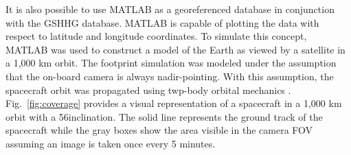 \documentclass[]{aiaa-tc}%
\begin{document}
It is also possible to use MATLAB as a georeferenced database in conjunction with the GSHHG database.  MATLAB is capable of plotting the data with respect to latitude and longitude coordinates.  To simulate this concept, MATLAB was used to construct a model of the Earth as viewed by a satellite in a 1,000 km orbit.  The footprint simulation was modeled under the assumption that the on-board camera is always nadir-pointing.  With this assumption, the spacecraft orbit was propagated using twp-body orbital mechanics \cite{UnderstandingSpace}.  Fig.~\ref{fig:coverage} provides a visual representation of a spacecraft in a 1,000 km orbit with a 56\degree inclination.  The solid line represents the ground track of the spacecraft while the gray boxes show the area visible in the camera FOV assuming an image is taken once every 5 minutes.
\end{document}
